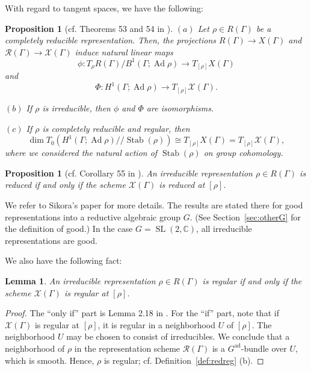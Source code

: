 \documentclass [11pt]{amsart}
\newtheorem {lemma}[theorem]{Lemma}
\newtheorem {proposition}[theorem]{Proposition}
\theoremstyle{remark}
\def\cc {{\mathbb{C}}}
\def\sslash {/ \! /}
\def\Gad{G^{\operatorname{ad}}}
\def\sl {{\operatorname{SL}(2, \cc)}}
\def\Rep {R}
\def\Rs {\mathscr{R}}
\def\Ad {\operatorname{Ad}}
\def\Char {X}
\def\Chars {\mathscr{X} \!}
\def\stab{\operatorname{Stab}}
\begin{document}
With regard to tangent spaces, we have the following:
\begin{proposition}[cf. Theorems 53 and 54 in \cite{Sikora}] 
\label{prop:TC}
$(a)$ Let $\rho \in \Rep(\Gamma)$ be a completely reducible representation. Then, the projections 
$\Rep(\Gamma) \to \Char(\Gamma)$ and  $\Rs(\Gamma) \to \Chars(\Gamma)$ induce natural linear maps
$$ \phi: T_{\rho} \Rep(\Gamma)/B^1(\Gamma; \Ad \rho) \to T_{[\rho]}\Char(\Gamma)$$
and
$$ \Phi: H^1(\Gamma; \Ad \rho) \to T_{[\rho]}\Chars(\Gamma).$$

$(b)$ If $\rho$ is irreducible, then $\phi$ and $\Phi$ are isomorphisms.

$(c)$ If $\rho$ is completely reducible and regular, then
$$ \dim T_0(H^1(\Gamma; \Ad \rho) \sslash \stab(\rho)) \cong T_{[\rho]} \Char(\Gamma) = T_{[\rho]} \Chars(\Gamma),$$
where we considered the natural action of $\stab(\rho)$ on group cohomology.
\end{proposition}

\begin{proposition}[cf. Corollary 55  in \cite{Sikora}]
\label{prop:red}
 An irreducible representation $\rho \in \Rep(\Gamma)$ is reduced if and only if the scheme $\Chars(\Gamma)$ is reduced at $[\rho]$.
\end{proposition}

We refer to Sikora's paper \cite{Sikora} for more details. The results are stated there for good representations into a reductive algebraic group $G$.  (See Section~\ref{sec:otherG} for the definition of good.) In the case $G=\sl$, all irreducible representations are good. 


We also have the following fact:
\begin{lemma}
\label{lem:reg}
 An irreducible representation $\rho \in \Rep(\Gamma)$ is regular if and only if the scheme $\Chars(\Gamma)$ is regular at $[\rho]$. 
\end{lemma}

\begin{proof}
The ``only if'' part is Lemma 2.18 in \cite{LubotzkyMagid}. For the ``if'' part, note that if $\Chars(\Gamma)$ is regular at $[\rho]$, it is regular in a neighborhood $U$ of $[\rho]$. The  neighborhood $U$ may be chosen to consist of irreducibles. We conclude that a neighborhood of $\rho$ in the representation scheme $\Rs(\Gamma)$ is a $\Gad$-bundle over $U$, which is smooth. Hence, $\rho$ is regular; cf. Definition~\ref{def:redreg} (b).
\end{proof}
\end{document}
